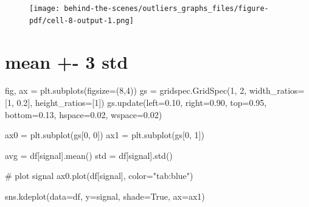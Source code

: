 \documentclass[
  letterpaper,
  DIV=11,
  numbers=noendperiod,
  oneside]{scrreprt}
\newenvironment{Shaded}{\begin{snugshade}}{\end{snugshade}}
\newcommand{\CommentTok}[1]{\textcolor[rgb]{0.37,0.37,0.37}{#1}}
\newcommand{\DecValTok}[1]{\textcolor[rgb]{0.68,0.00,0.00}{#1}}
\newcommand{\FloatTok}[1]{\textcolor[rgb]{0.68,0.00,0.00}{#1}}
\newcommand{\NormalTok}[1]{\textcolor[rgb]{0.00,0.23,0.31}{#1}}
\newcommand{\OperatorTok}[1]{\textcolor[rgb]{0.37,0.37,0.37}{#1}}
\newcommand{\StringTok}[1]{\textcolor[rgb]{0.13,0.47,0.30}{#1}}
\newcommand{\VariableTok}[1]{\textcolor[rgb]{0.07,0.07,0.07}{#1}}
\begin{document}
\begin{figure}[H]

{\centering \texttt{[image: behind-the-scenes/outliers\_graphs\_files/figure-pdf/cell-8-output-1.png]}

}

\end{figure}

\hypertarget{mean---3-std}{%
\section{mean +- 3 std}\label{mean---3-std}}

\begin{Shaded}
\begin{Highlighting}[]
\NormalTok{fig, ax }\OperatorTok{=}\NormalTok{ plt.subplots(figsize}\OperatorTok{=}\NormalTok{(}\DecValTok{8}\NormalTok{,}\DecValTok{4}\NormalTok{))}
\NormalTok{gs }\OperatorTok{=}\NormalTok{ gridspec.GridSpec(}\DecValTok{1}\NormalTok{, }\DecValTok{2}\NormalTok{, width\_ratios}\OperatorTok{=}\NormalTok{[}\DecValTok{1}\NormalTok{, }\FloatTok{0.2}\NormalTok{], height\_ratios}\OperatorTok{=}\NormalTok{[}\DecValTok{1}\NormalTok{])}
\NormalTok{gs.update(left}\OperatorTok{=}\FloatTok{0.10}\NormalTok{, right}\OperatorTok{=}\FloatTok{0.90}\NormalTok{, top}\OperatorTok{=}\FloatTok{0.95}\NormalTok{, bottom}\OperatorTok{=}\FloatTok{0.13}\NormalTok{,}
\NormalTok{          hspace}\OperatorTok{=}\FloatTok{0.02}\NormalTok{, wspace}\OperatorTok{=}\FloatTok{0.02}\NormalTok{)}

\NormalTok{ax0 }\OperatorTok{=}\NormalTok{ plt.subplot(gs[}\DecValTok{0}\NormalTok{, }\DecValTok{0}\NormalTok{])}
\NormalTok{ax1 }\OperatorTok{=}\NormalTok{ plt.subplot(gs[}\DecValTok{0}\NormalTok{, }\DecValTok{1}\NormalTok{])}

\NormalTok{avg }\OperatorTok{=}\NormalTok{ df[}\StringTok{\textquotesingle{}signal\textquotesingle{}}\NormalTok{].mean()}
\NormalTok{std }\OperatorTok{=}\NormalTok{ df[}\StringTok{\textquotesingle{}signal\textquotesingle{}}\NormalTok{].std()}

\CommentTok{\# plot signal}
\NormalTok{ax0.plot(df[}\StringTok{\textquotesingle{}signal\textquotesingle{}}\NormalTok{], color}\OperatorTok{=}\StringTok{"tab:blue"}\NormalTok{)}

\NormalTok{sns.kdeplot(data}\OperatorTok{=}\NormalTok{df, y}\OperatorTok{=}\StringTok{\textquotesingle{}signal\textquotesingle{}}\NormalTok{, shade}\OperatorTok{=}\VariableTok{True}\NormalTok{, ax}\OperatorTok{=}\NormalTok{ax1)}


\end{Highlighting}
\end{Shaded}
\end{document}
